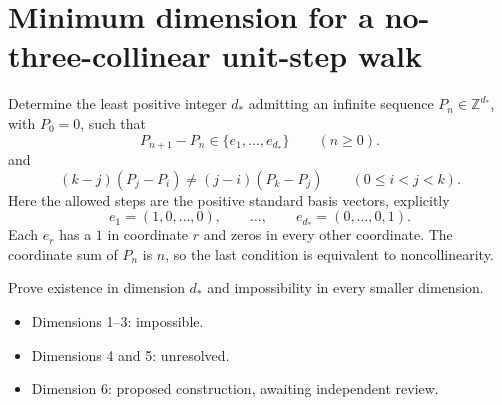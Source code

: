 \documentclass[11pt]{article}
\begin{document}
\section*{Minimum dimension for a no-three-collinear unit-step walk}
Determine the least positive integer $d_*$ admitting an infinite sequence
$P_n\in\mathbb Z^{d_*}$, with $P_0=0$, such that
\[
P_{n+1}-P_n\in\{e_1,\ldots,e_{d_*}\}\qquad(n\ge0).
\]
and
\[
(k-j)(P_j-P_i)\ne(j-i)(P_k-P_j) \qquad(0\le i<j<k).
\]
Here the allowed steps are the positive standard basis vectors, explicitly
\[
e_1=(1,0,\ldots,0),\qquad\ldots,\qquad e_{d_*}=(0,\ldots,0,1).
\]
Each $e_r$ has a $1$ in coordinate $r$ and zeros in every other coordinate.
The coordinate sum of $P_n$ is $n$, so the last condition is equivalent
to noncollinearity.

Prove existence in dimension $d_*$ and impossibility in every smaller dimension.
\begin{itemize}
\item Dimensions 1--3: impossible.
\item Dimensions 4 and 5: unresolved.
\item Dimension 6: proposed construction, awaiting independent review.
\end{itemize}
\end{document}
